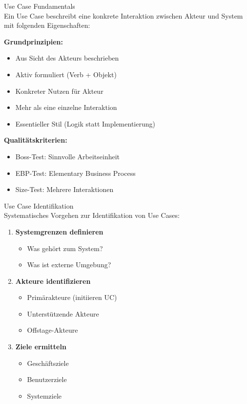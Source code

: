 \begin{concept}{Use Case Fundamentals}\\
Ein Use Case beschreibt eine konkrete Interaktion zwischen Akteur und System mit folgenden Eigenschaften:

\textbf{Grundprinzipien:}
\begin{itemize}
    \item Aus Sicht des Akteurs beschrieben
    \item Aktiv formuliert (Verb + Objekt)
    \item Konkreter Nutzen für Akteur
    \item Mehr als eine einzelne Interaktion
    \item Essentieller Stil (Logik statt Implementierung)
\end{itemize}

\textbf{Qualitätskriterien:}
\begin{itemize}
    \item Boss-Test: Sinnvolle Arbeitseinheit
    \item EBP-Test: Elementary Business Process
    \item Size-Test: Mehrere Interaktionen
\end{itemize}
\end{concept}

\begin{theorem}{Use Case Identifikation}\\
Systematisches Vorgehen zur Identifikation von Use Cases:

\begin{enumerate}
    \item \textbf{Systemgrenzen definieren}
    \begin{itemize}
        \item Was gehört zum System?
        \item Was ist externe Umgebung?
    \end{itemize}

    \item \textbf{Akteure identifizieren}
    \begin{itemize}
        \item Primärakteure (initiieren UC)
        \item Unterstützende Akteure
        \item Offstage-Akteure
    \end{itemize}

    \item \textbf{Ziele ermitteln}
    \begin{itemize}
        \item Geschäftsziele
        \item Benutzerziele
        \item Systemziele
    \end{itemize}
\end{enumerate}
\end{theorem}

